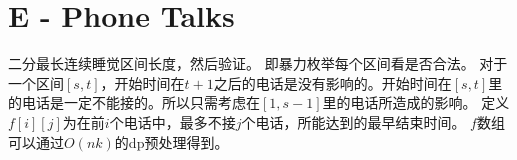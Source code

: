 \section{E - Phone Talks}
二分最长连续睡觉区间长度，然后验证。
即暴力枚举每个区间看是否合法。
对于一个区间$[s,t]$，开始时间在$t+1$之后的电话是没有影响的。开始时间在$[s,t]$里的电话是一定不能接的。所以只需考虑在$[1,s-1]$里的电话所造成的影响。
定义$f[i][j]$为在前$i$个电话中，最多不接$j$个电话，所能达到的最早结束时间。
$f$数组可以通过$O(nk)$的dp预处理得到。
